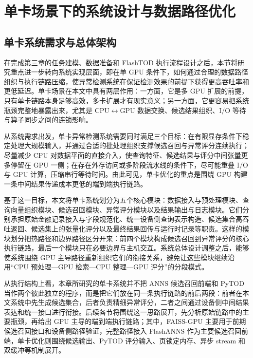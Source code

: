 
\chapter{单卡场景下的系统设计与数据路径优化}

\section{单卡系统需求与总体架构}

在完成第三章的任务建模、数据准备和 FlashTOD 执行流程设计之后，本节将研究重点进一步转向系统实现层面，即在单 GPU 条件下，如何通过合理的数据路径组织与执行链路压缩，使异常检测系统在保证检测效果的前提下获得更高吞吐率和更低延迟。单卡场景在本文中具有两层作用：一方面，它是多 GPU 扩展的前提，只有单卡链路本身足够高效，多卡扩展才有现实意义；另一方面，它更容易把系统瓶颈完整地暴露出来，尤其是 CPU$\leftrightarrow$GPU 数据交换、候选结果组织、I/O 等待与算子同步之间的连锁影响。

从系统需求出发，单卡异常检测系统需要同时满足三个目标：在有限显存条件下稳定处理大规模输入，并通过合适的批处理组织支撑候选召回与异常评分连续执行；尽量减少 CPU 对数据平面的直接介入，使查询特征、候选结果与评分中间张量更多停留在 GPU 一侧；在存在外存访问或多阶段流水线的条件下，尽可能重叠 I/O 与 GPU 计算，压缩串行等待时间。由此可见，单卡优化的重点是围绕 GPU 构建一条中间结果传递成本更低的端到端执行链路。

基于这一目标，本文将单卡系统划分为五个核心模块：数据接入与预处理模块、查询向量组织模块、候选召回模块、异常评分模块以及结果输出与日志模块。它们分别承担原始金融记录接入与字段规范化、统一设备侧查询表示构造、候选集合高吞吐返回、候选集上的张量化评分以及最终结果回传与运行时记录等职责。这样的模块划分把热路径和边界路径区分开来：前四个模块构成候选召回到异常评分的核心执行链路，最后一个模块只在必要边界与主机交互。系统总体设计调整之后，能够使系统围绕 GPU 主导路径重新组织它们的衔接关系，避免让这些模块继续沿用``CPU 预处理---GPU 检索---CPU 整理---GPU 评分''的分段模式。

从执行结构上看，本章所研究的单卡系统并不把 ANNS 候选召回前端和 PyTOD 当作两个彼此独立的程序，而是把它们放在同一条执行链路的前后两段：前者在本文系统中先生成候选集合，后者负责精细异常评分，二者之间通过设备侧中间结果表达和统一接口进行衔接。后续各节将围绕这一思路展开，先分析原始链路中的主要瓶颈，再给出 GPU 主导的端到端执行链路；其中，FAISS-GPU 主要用于前期候选召回接口和设备侧路径验证，完整路径接入 FlashANNS 作为主要候选召回前端，单卡优化则围绕候选输出、PyTOD 评分输入、页锁定内存、异步 stream 和双缓冲等机制展开。


